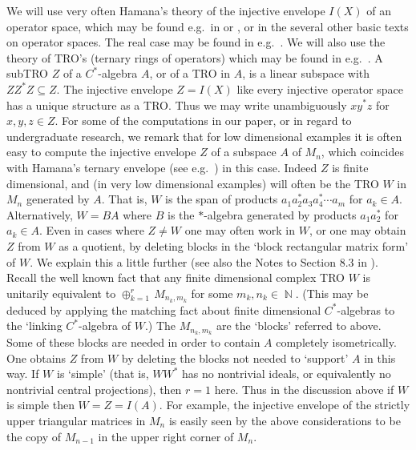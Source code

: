 \documentclass{amsart}
\theoremstyle{remark}
\theoremstyle{definition}
\numberwithin{equation}{section}
\DeclareMathOperator{\bN}{{\mathbb N}}
\begin{document}
        We will use very often Hamana's theory of the injective envelope $I(X)$ of an operator space, 
        which may be found e.g.\ in \cite[Chapter 4]{BLM} or \cite{Ha}, or in the several other basic texts on operator spaces. 
        The real case may be found in e.g.\ \cite{BReal,BCK}. 
        We will also use the theory of TRO's (ternary rings of operators) which may be found in e.g.\ \cite[Chapters 4 and 8]{BLM}.  A subTRO $Z$ of a $C^*$-algebra $A$, or 
        of a TRO in $A$, is a linear subspace with $Z Z^* Z \subseteq Z$. 
        The
        injective envelope $Z = I(X)$ like every injective operator  space has a unique structure as a TRO.  Thus we may write unambiguously 
        $x y^* z$ for $x, y, z \in Z$. 
        For some of the computations in our paper, or in regard to undergraduate research, we remark that for low dimensional examples it is often easy to compute the injective envelope $Z$ of 
        a subspace $A$ of $M_n$, which coincides with Hamana's ternary envelope (see e.g.\
        \cite[Chapters 4 and 8]{BLM})  in this case.   
        Indeed $Z$ is finite dimensional, and  
        (in very low dimensional examples) will         often  be the 
        TRO $W$ in $M_n$ generated by $A$.  That is, $W$ is the span of products $a_1 a_2^* a_3 a_4^* \cdots 
                a_m$ for $a_k \in A.$ 
        Alternatively, $W = B A$ where 
        $B$ is the $*$-algebra generated by 
        products $a_1 a_2^*$ for $a_k \in A.$
        Even in cases where $Z \neq W$ one may often work in $W$, or one may obtain $Z$ from $W$ as a quotient, by deleting blocks in the `block rectangular matrix form' of $W$.  We explain this a little further (see also the Notes to Section 8.3 in \cite{BLM}).  Recall the well known fact 
        that any finite dimensional complex TRO $W$ 
        is unitarily equivalent to $\oplus_{k = 1}^r \, M_{n_k,m_k}$ for some $m_k,n_k \in \bN$.  
        (This may be deduced by applying the matching fact about finite dimensional $C^*$-algebras to the `linking
        $C^*$-algebra of $W$.) 
        The $M_{n_k,m_k}$ are the `blocks' referred to above.
        Some of these blocks are needed in order to contain $A$ completely isometrically.
        One obtains $Z$ from $W$ by deleting the blocks not needed to `support'  
        $A$ in this way.
        If $W$ is `simple' (that is, $W W^*$ has no nontrivial ideals, or equivalently no nontrivial  central projections), then $r = 1$ here.  Thus in the         discussion above if $W$ is simple then $W = Z = I(A)$.  For example, the injective envelope of the strictly upper triangular matrices in $M_n$ is easily seen by the above considerations to be the copy of $M_{n-1}$ in the upper right  corner of $M_n$. 
        
\end{document}
